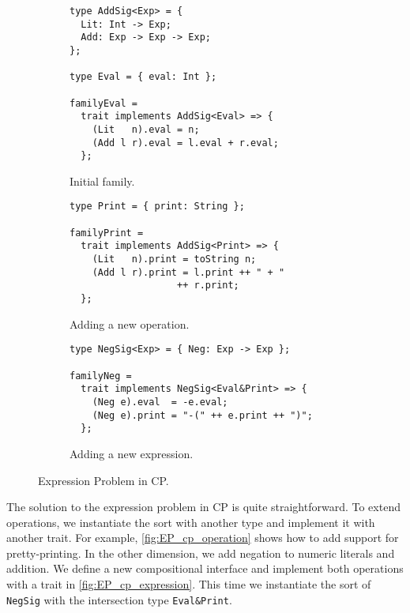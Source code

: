 \begin{figure}
\begin{minipage}{.5\textwidth}
\begin{subfigure}{\textwidth}
\begin{lstlisting}[basicstyle=\ttfamily\footnotesize]
type AddSig<Exp> = {
  Lit: Int -> Exp;
  Add: Exp -> Exp -> Exp;
};

type Eval = { eval: Int };

familyEval =
  trait implements AddSig<Eval> => {
    (Lit   n).eval = n;
    (Add l r).eval = l.eval + r.eval;
  };
\end{lstlisting}
\caption{Initial family.}\label{fig:EP_cp_initial}
\end{subfigure}
\end{minipage}%
\begin{minipage}{.5\textwidth}
\begin{subfigure}{\textwidth}
\begin{lstlisting}[basicstyle=\ttfamily\footnotesize]
type Print = { print: String };

familyPrint =
  trait implements AddSig<Print> => {
    (Lit   n).print = toString n;
    (Add l r).print = l.print ++ " + "
                   ++ r.print;
  };
\end{lstlisting}
\caption{Adding a new operation.}\label{fig:EP_cp_operation}
\end{subfigure}
\par\bigskip
\begin{subfigure}{\textwidth}
\begin{lstlisting}[basicstyle=\ttfamily\footnotesize]
type NegSig<Exp> = { Neg: Exp -> Exp };

familyNeg =
  trait implements NegSig<Eval&Print> => {
    (Neg e).eval  = -e.eval;
    (Neg e).print = "-(" ++ e.print ++ ")";
  };
\end{lstlisting}
\caption{Adding a new expression.}\label{fig:EP_cp_expression}
\end{subfigure}
\end{minipage}
\caption{Expression Problem in CP.}
\end{figure}

The solution to the expression problem in CP is quite straightforward. To extend
operations, we instantiate the sort with another type and implement it with
another trait. For example, \autoref{fig:EP_cp_operation} shows how to add
support for pretty-printing. In the other dimension, we add negation to numeric
literals and addition. We define a new compositional interface and implement
both operations with a trait in \autoref{fig:EP_cp_expression}. This time we
instantiate the sort of \lstinline{NegSig} with the intersection type
\lstinline{Eval&Print}.

